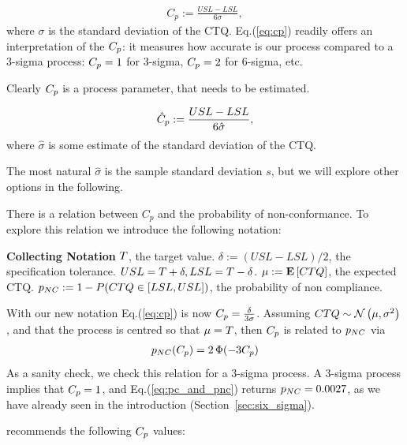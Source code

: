 \begin{definition}[$\cp$]
\begin{align}
\label{eq:cp}
	C_p:= \frac{USL-LSL}{6 \sigma}, 
\end{align}
where $\sigma$ is the standard deviation of the CTQ.
Eq.(\ref{eq:cp}) readily offers an interpretation of the $\cp$: it measures how accurate is our process compared to a 3-sigma process: $C_p=1$ for 3-sigma, $C_p=2$ for 6-sigma, etc.
\end{definition}
Clearly $\cp$ is a process parameter, that needs to be estimated.
\begin{definition}[$\cpHat$]
\begin{align}
	\hat{C}_p:= \frac{USL-LSL}{6 \hat{\sigma}}, 
\end{align}
where $\hat{\sigma}$ is some estimate of the standard deviation of the CTQ.
\end{definition}
The most natural $\hat{\sigma}$ is the sample standard deviation $s$, but we will explore other options in the following.


There is a relation between $C_p$ and the probability of non-conformance. 
To explore this relation we introduce the following notation:
\begin{tcolorbox}
\footnotesize
\textbf{Collecting Notation} \newline
$T$, the target value. \newline
$\delta:= (USL-LSL)/2$, the specification tolerance. $USL=T+\delta, LSL=T-\delta$.  \newline
$\mu:= \mathbf{E}\left[ CTQ \right]$, the expected CTQ. \newline
$p_{NC}:= 1-P(CTQ \in [LSL,USL])$, the probability of non compliance. 
\end{tcolorbox}

With our new notation Eq.(\ref{eq:cp}) is now $C_p=\frac{\delta}{3 \sigma}$.
Assuming $CTQ \sim \mathcal{N}\left(\mu, \sigma^2\right)$, and that the process is centred so that $\mu=T$, then $\cp$ is related to $p_{NC}$ via
\begin{align}
\label{eq:pc_and_pnc}
	p_{NC}(C_p) = 2\, \Phi(-3 C_p)
\end{align}
As a sanity check, we check this relation for a 3-sigma process.
A 3-sigma process implies that $C_p=1$, and Eq.(\ref{eq:pc_and_pnc}) returns $p_{NC}=0.0027$, as we have already seen in the introduction (Section~\ref{sec:six_sigma}).

\cite{montgomery_introduction_2007} recommends the following $\cp$ values:

